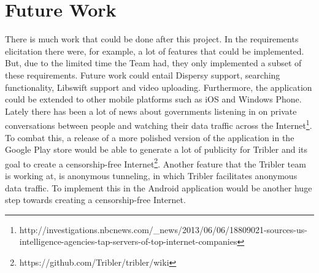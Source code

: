 \section{Future Work}
\thispagestyle{fancy}
There is much work that could be done after this project. In the requirements elicitation there were, for example, a lot of features that could be implemented. But, due to the limited time the Team had, they only implemented a subset of these requirements. Future work could entail Dispersy support, searching functionality, Libswift support and video uploading. Furthermore, the application could be extended to other mobile platforms such as iOS and Windows Phone. Lately there has been a lot of news about governments listening in on private conversations between people and watching their data traffic across the Internet\footnote{http://investigations.nbcnews.com/\_news/2013/06/06/18809021-sources-us-intelligence-agencies-tap-servers-of-top-internet-companies}. To combat this, a release of a more polished version of the application in the Google Play store would be able to generate a lot of publicity for Tribler and its goal to create a censorship-free Internet\footnote{https://github.com/Tribler/tribler/wiki}. Another feature that the Tribler team is working at, is anonymous tunneling, in which Tribler facilitates anonymous data traffic. To implement this in the Android application would be another huge step towards creating a censorship-free Internet.